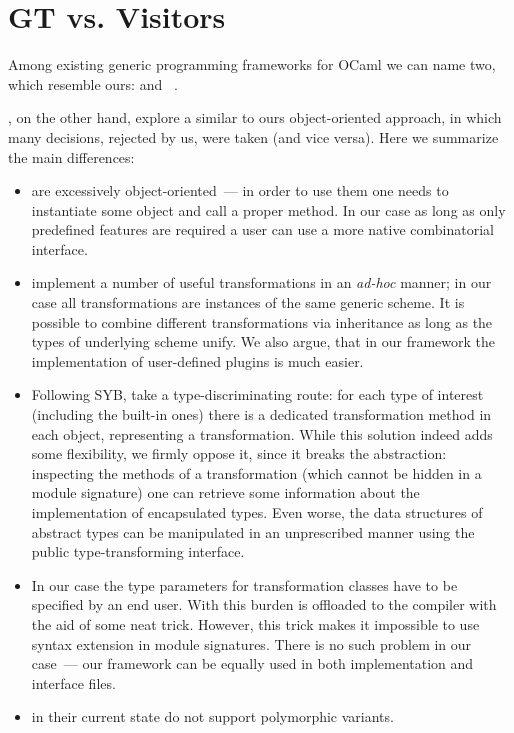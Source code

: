 \section{GT vs. Visitors}

Among existing generic programming frameworks for OCaml we can name two, which resemble ours:  and ~\cite{Visitors}.

, on the other hand, explore a similar to ours object-oriented approach, in which many decisions, rejected by us, were taken (and vice versa). Here
we summarize the main differences:

\begin{itemize}
   \item {} are excessively object-oriented~--- in order to use them one needs to instantiate some object and call a proper method. In our case as long as
     only predefined features are required a user can use a more native combinatorial interface.
     
   \item {} implement a number of useful transformations in an \emph{ad-hoc} manner; in our case all transformations are instances of the
     same generic scheme. It is possible to combine different transformations via inheritance as long as the types of underlying scheme unify. We also argue, that
     in our framework the implementation of user-defined plugins is much easier.
     
   \item Following SYB,  take a type-discriminating route: for each type of interest (including the built-in ones) there is a dedicated
     transformation method in each object, representing a transformation. While this solution indeed adds some flexibility, we firmly oppose it, since it
     breaks the abstraction: inspecting the methods of a transformation (which cannot be hidden in a module signature) one can retrieve some
     information about the implementation of encapsulated types. Even worse, the data structures of abstract types can be manipulated in an unprescribed
     manner using the public type-transforming interface.

   \item In our case the type parameters for transformation classes have to be specified by an end user. With  this burden is offloaded to the
     compiler with the aid of some neat trick. However, this trick makes it impossible to use  syntax extension in module signatures. There is no
     such problem in our case~--- our framework can be equally used in both implementation and interface files.

   \item {} in their current state do not support polymorphic variants.
\end{itemize}
